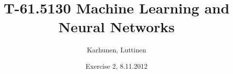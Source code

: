 
\title{T-61.5130 Machine Learning and Neural Networks}
\author{Karhunen, Luttinen}
\date{Exercise 2, 8.11.2012}

\usepackage{cancel}


\newcommand{\vect}[1]{{\bf{#1}}}
\newcommand{\svect}[1]{\boldsymbol{#1}}
\newcommand{\matr}[1]{\boldsymbol{#1}}
\newcommand{\vw}{{\bf{w}}}
\newcommand{\ve}{{\bf{e}}}
\newcommand{\vx}{{\bf{x}}}



\maketitle

